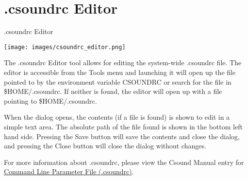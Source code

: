 \section{.csoundrc Editor}\label{csoundrcEditor}

.csoundrc Editor

\texttt{[image: images/csoundrc\_editor.png]}

The .csoundrc Editor tool allows for editing the system-wide .csoundrc
file. The editor is accessible from the Tools menu and launching it will
open up the file pointed to by the environment variable CSOUNDRC or
search for the file in \$HOME/.csoundrc. If neither is found, the editor
will open up with a file pointing to \$HOME/.csoundrc.

When the dialog opens, the contents (if a file is found) is shown to
edit in a simple text area. The absolute path of the file found is shown
in the bottom left hand side. Pressing the Save button will save the
contents and close the dialog, and pressing the Close button will close
the dialog without changes.

For more information about .csoundrc, please view the Csound Manual
entry for
\href{http://www.csounds.com/manual/html/CommandUnifileParFile.html}{Command
Line Parameter File (.csoundrc)}.
